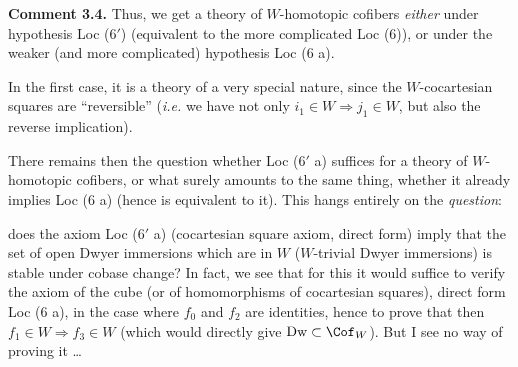 \textbf{Comment 3.4.} Thus, we get a theory of $W$-homotopic cofibers \textit{either} under hypothesis Loc (6$'$) (equivalent to the more complicated Loc (6)), or under the weaker (and more complicated) hypothesis Loc (6 a).

In the first case, it is a theory of a very special nature, since the $W$-cocartesian squares are ``reversible'' (\textit{i.e.} we have not only $i_1 \in W \Longrightarrow j_1 \in W$, but also the reverse implication).

There remains then the question whether Loc (6$'$ a) suffices for a theory of $W$-homotopic cofibers, or what surely amounts to the same thing, whether it already implies Loc (6 a) (hence is equivalent to it). This hangs entirely on the \textit{question}:

does the axiom Loc (6$'$ a) (cocartesian square axiom, direct form) imply that the set of open Dwyer immersions which are in $W$ ($W$-trivial Dwyer immersions) is stable under cobase change? In fact, we see that for this it would suffice to verify the axiom of the cube (or of homomorphisms of cocartesian squares), direct form Loc (6 a), in the case where $f_0$ and $f_2$ are identities, hence to prove that then $f_1 \in W \Longrightarrow f_3 \in W$ (which would directly give $\mathrm{Dw} \subset \Cof_W$). But I see no way of proving it \dots

